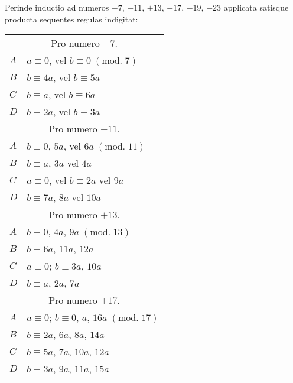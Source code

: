 \documentclass[twoside,12pt, showframe]{memoir}
\renewcommand{\pmod}[1]{\;(\textrm{mod.}\;#1)}
\begin{document}
Perinde inductio ad numeros \(-7\), \(-11\), \(+13\), \(+17\), \(-19\), \(-23\) applicata satisque producta sequentes regulas indigitat:
\begin{center}
\begin{tabular}{l|l}
\multicolumn{2}{c}{Pro numero \(-7\).}\\
\(A\) & \(a \equiv 0\), vel \(b \equiv 0\pmod{7}\) \\
\(B\) & \(b \equiv 4 a\), vel \(b \equiv 5 a\) \\
\(C\) & \(b \equiv a\), vel \(b \equiv 6 a\) \\
\(D\) & \(b \equiv 2 a\), vel \(b \equiv 3 a\) \\
\multicolumn{2}{c}{Pro numero \(-11\).}\\
\(A\) & \(b \equiv 0\), \(5 a\), vel \(6 a\pmod{11}\) \\
\(B\) & \(b \equiv a\), \(3 a\) vel \(4 a\) \\
\(C\) & \(a \equiv 0\), vel \(b \equiv 2 a\) vel \(9 a\) \\
\(D\) & \(b \equiv 7 a\), \(8 a\) vel \(10 a\) \\
\multicolumn{2}{c}{Pro numero \(+13\).}\\
\(A\) & \(b \equiv 0\), \(4a\), \(9 a\pmod{13}\) \\
\(B\) & \(b \equiv 6 a\), \(11 a\), \(12 a\) \\
\(C\) & \(a \equiv 0\); \(b \equiv 3 a\), \(10 a\) \\
\(D\) & \(b \equiv a\), \(2 a\), \(7 a\) \\
\multicolumn{2}{c}{Pro numero \(+17\).}\\
\(A\) & \(a \equiv 0\); \(b \equiv 0\), \(a\), \(16 a\pmod{17}\)\\
\(B\) & \(b \equiv 2 a\), \(6 a\), \(8 a\), \(14 a\)\\
\(C\) & \(b \equiv 5 a\), \(7 a\), \(10 a\), \(12 a\)\\
\(D\) & \(b \equiv 3 a\), \(9 a\), \(11 a\), \(15 a\)
\end{tabular}
\end{center}\clearpage\noindent%
\end{document}
